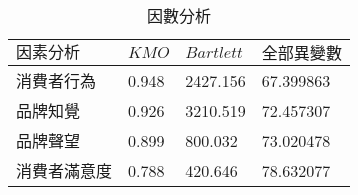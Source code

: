 \begin{table}[htb]
\caption{因數分析}
\label{tab:p4}
\renewcommand{\arraystretch}{1.2} %
\arrayrulewidth=1pt               %
\tabcolsep=18pt                   %
\begin{tabular}[t]{llll}  %
\hline
 $因素分析$& $KMO$ & $Bartlett$& $全部異變數$ \\
\hline
消費者行為&0.948&2427.156&67.399863\\
 品牌知覺&0.926&3210.519&72.457307  \\
 品牌聲望&0.899&800.032&73.020478  \\
消費者滿意度&0.788&420.646&78.632077  \\
\hline
\end{tabular}
\end{table}


